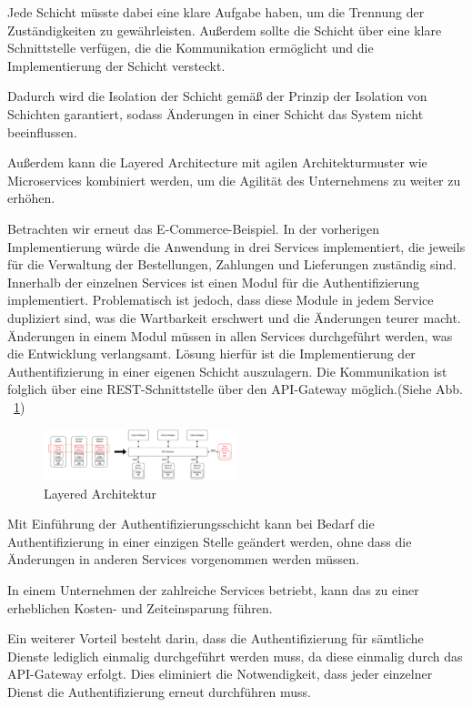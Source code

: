 \documentclass[acmtog]{acmart}
\begin{document}
Jede Schicht müsste dabei eine klare Aufgabe haben, um die Trennung der Zuständigkeiten zu gewährleisten.
Außerdem sollte die Schicht über eine klare Schnittstelle verfügen, die die Kommunikation ermöglicht und
die Implementierung der Schicht versteckt.

Dadurch wird die Isolation der Schicht gemäß der Prinzip der Isolation von Schichten garantiert, sodass Änderungen
in einer Schicht das System nicht beeinflussen.

Außerdem kann die Layered Architecture mit agilen Architekturmuster wie Microservices
kombiniert werden, um die Agilität des Unternehmens zu weiter zu erhöhen.

Betrachten wir erneut das E-Commerce-Beispiel.
In der vorherigen Implementierung würde die Anwendung in drei Services implementiert,
die jeweils für die Verwaltung der Bestellungen, Zahlungen und Lieferungen zuständig sind.
Innerhalb der einzelnen Services ist einen Modul für die Authentifizierung
implementiert.
Problematisch ist jedoch, dass diese Module in jedem Service dupliziert sind,
was die Wartbarkeit erschwert und die Änderungen teurer macht.
Änderungen in einem Modul müssen in allen Services durchgeführt werden, was die
Entwicklung verlangsamt.
Lösung hierfür ist die Implementierung der Authentifizierung in einer
eigenen Schicht auszulagern.
Die Kommunikation ist folglich über eine REST-Schnittstelle über den API-Gateway möglich.(Siehe Abb. ~\ref{fig:layered})

\begin{figure}[h!]
    \centering
    \includegraphics[width=0.5\textwidth]{images/layered/ecommerce-example}
    \caption{Layered Architektur }
    \label{fig:layered}
\end{figure}

Mit Einführung der Authentifizierungsschicht kann bei Bedarf die Authentifizierung
in einer einzigen Stelle geändert werden, ohne dass die Änderungen in anderen Services
vorgenommen werden müssen.

In einem Unternehmen der zahlreiche Services betriebt, kann das zu einer erheblichen
Kosten- und Zeiteinsparung führen.

Ein weiterer Vorteil besteht darin, dass die Authentifizierung für sämtliche Dienste lediglich
einmalig durchgeführt werden muss, da diese einmalig durch das API-Gateway erfolgt.
 Dies eliminiert die Notwendigkeit, dass jeder einzelner Dienst die Authentifizierung erneut durchführen muss.
\end{document}
